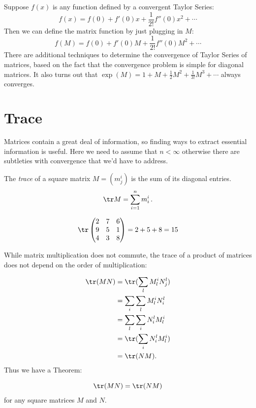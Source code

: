 Suppose $f(x)$ is any function defined by a convergent Taylor Series:
\[
f(x) = f(0) + f'(0)x + \frac{1}{2!}f''(0)x^2 + \cdots
\]
Then we can define the matrix function by just plugging in $M$:
\[
f(M) = f(0) + f'(0)M + \frac{1}{2!}f''(0)M^2 + \cdots
\]
There are additional techniques to determine the convergence of Taylor Series of matrices, based on the fact that the convergence problem is simple for diagonal matrices.  It also turns out that $\exp (M) = 1 + M + \frac{1}{2}M^2 + \frac{1}{3!}M^3 + \cdots$ always converges.



\section{Trace}

Matrices contain a great deal of information, so finding ways to extract essential information is useful. Here we need to assume that $n < \infty$ otherwise there are subtleties with convergence that we'd have to address.

\begin{definition}
The \emph{trace} of a square matrix $M=(m_j^i)$ is the sum of its diagonal entries.
\[
\tr M = \sum_{i=1}^{n}m_i^i\, .
\]
\end{definition}

\begin{example}
\[
\tr \begin{pmatrix}
2 & 7 & 6\\
9 & 5 & 1\\
4 & 3 & 8\\
\end{pmatrix} = 2+5+8 = 15
\]
\end{example}
While matrix multiplication does not commute, the trace of a product of matrices does not depend on the order of multiplication:

\begin{align*}
\tr(MN) & = \tr( \sum_l M_l^i N_j^l ) \\
& = \sum_i \sum_l M_l^i N_i^l \\
& = \sum_l \sum_i N_i^l M_l^i \\
& = \tr( \sum_i N_i^l M_l^i ) \\
& = \tr( NM ).
\end{align*}
Thus we have a Theorem:
\begin{theorem} \[\tr(MN)=\tr(NM)\] for any square matrices $M$ and $N$.
\end{theorem}

